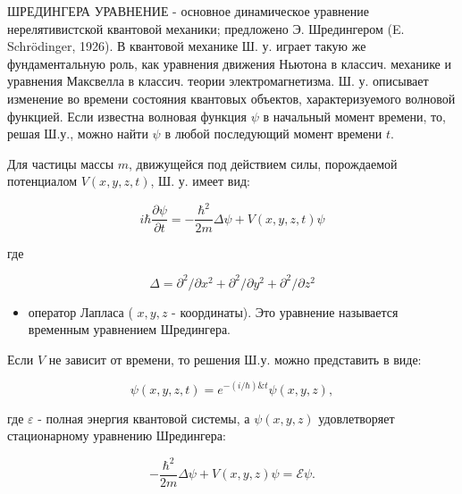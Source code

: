 \documentclass[10pt]{article}
\begin{document}
ШРЕДИНГЕРА УРАВНЕНИЕ - основное динамическое уравнение нерелятивистской квантовой механики; предложено Э. Шредингером (E. Schrödinger, 1926). В квантовой механике Ш. у. играет такую же фундаментальную роль, как уравнения движения Ньютона в классич. механике и уравнения Максвелла в классич. теории электромагнетизма. Ш. у. описывает изменение во времени состояния квантовых объектов, характеризуемого волновой функцией. Если известна волновая функция $\psi$ в начальный момент времени, то, решая Ш.у., можно найти $\psi$ в любой последующий момент времени $t$.



Для частицы массы $m$, движущейся под действием силы, порождаемой потенциалом $V(x, y, z, t)$, Ш. у. имеет вид:



\[

i \hbar \frac{\partial \psi}{\partial t}=-\frac{\hbar^{2}}{2 m} \Delta \psi+V(x, y, z, t) \psi

\]



где



\[

\Delta=\partial^{2} / \partial x^{2}+\partial^{2} / \partial y^{2}+\partial^{2} / \partial z^{2}

\]



\begin{itemize}

  \item оператор Лапласа ( $x, y, z$ - координаты). Это уравнение называется временным уравнением Шредингера.

\end{itemize}



Если $V$ не зависит от времени, то решения Ш.у. можно представить в виде:



\[

\psi(x, y, z, t)=e^{-(i / \hbar) \& t} \psi(x, y, z),

\]



где $\mathscr{\varepsilon}$ - полная энергия квантовой системы, а $\psi(x, y, z)$ удовлетворяет стационарному уравнению Шредингера:



\[

-\frac{\hbar^{2}}{2 m} \Delta \psi+V(x, y, z) \psi=\mathscr{E} \psi .

\]
\end{document}
